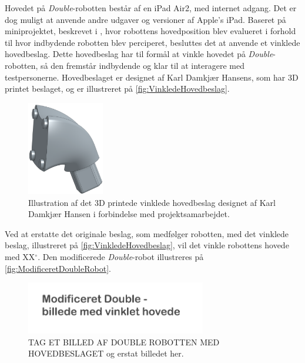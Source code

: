 %
Hovedet på \textit{Double}-robotten består af en iPad Air2, med internet adgang. Det er dog muligt at anvende andre udgaver og versioner af Apple's iPad. Baseret på miniprojektet, beskrevet i \fullref{\MiniprojektHovedeVinkelpartname}, hvor robottens hovedposition blev evalueret i forhold til hvor indbydende robotten blev perciperet, besluttes det at anvende et vinklede hovedbeslag. Dette hovedbeslag har til formål at vinkle hovedet på \textit{Double}-robotten, så den fremstår indbydende og klar til at interagere med testpersonerne. Hovedbeslaget er designet af Karl Damkjær Hansens, som har 3D printet beslaget, og er illustreret på \autoref{fig:VinkledeHovedbeslag}.            
%
\begin{figure}[H]
\centering
\includegraphics[width = 0.3\textwidth]{Figure/VinkledeHovedbeslag} 
\caption{Illustration af det 3D printede vinklede hovedbeslag designet af Karl Damkjær Hansen i forbindelse med projektsamarbejdet.}
\label{fig:VinkledeHovedbeslag}
\end{figure}
\noindent
%
Ved at erstatte det originale beslag, som medfølger robotten, med det vinklede beslag, illustreret på \autoref{fig:VinkledeHovedbeslag}, vil det vinkle robottens hovede med XX$^{\circ}$. Den modificerede \textit{Double}-robot illustreres på \autoref{fig:ModificeretDoubleRobot}.
%
\begin{figure}[H]
\centering
\includegraphics[width = 0.7\textwidth]{Figure/ModificeretDouble} 
\caption{TAG ET BILLED AF DOUBLE ROBOTTEN MED HOVEDBESLAGET og erstat billedet her.}
\label{fig:ModificeretDoubleRobot}
\end{figure}
\noindent
%
